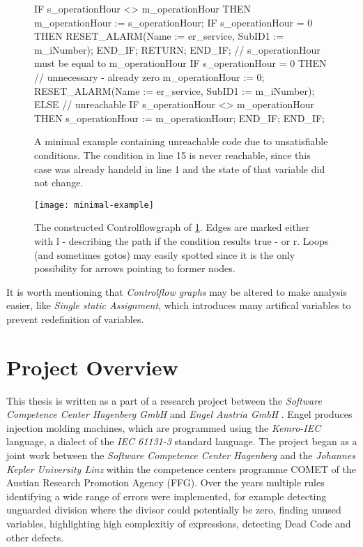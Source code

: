 \begin{figure}
    \begin{GenericCode}
    IF s_operationHour <> m_operationHour THEN
        m_operationHour := s_operationHour;
        IF s_operationHour = 0 THEN
            RESET_ALARM(Name := er_service, SubID1 := m_iNumber);
        END_IF;
        RETURN;
    END_IF;
    // s_operationHour must be equal to m_operationHour
    IF s_operationHour = 0 THEN
        // unnecessary - already zero
        m_operationHour := 0;
        RESET_ALARM(Name := er_service, SubID1 := m_iNumber);
    ELSE
        // unreachable
        IF s_operationHour <> m_operationHour THEN
            s_operationHour := m_operationHour;
        END_IF;
    END_IF;
    \end{GenericCode}
    \caption{A minimal example containing unreachable code due to unsatisfiable conditions. The condition in line 15 is never reachable, since this case was already handeld in line 1 and the state of that variable did not change.}
    \label{code:ex1}
\end{figure}
\begin{figure}
  \centering
  \texttt{[image: minimal-example]}
  \caption{The constructed Controlflowgraph of \ref{code:ex1}. Edges are marked either with l - describing the path if the condition results true - or r. Loops (and sometimes gotos) may easily spotted since it is the only possibility for arrows pointing to former nodes.}
  \label{fig:cfg}
\end{figure}

It is worth mentioning that \emph{Controlflow graphs} may be altered to make analysis easier, like \emph {Single static Assignment}, which introduces many artifical variables to prevent redefinition of variables.

\section{Project Overview}
This thesis is written as a part of a research project between the \emph{Software Competence Center Hagenberg GmbH} \cite{ScchGmbH} and \emph{Engel Austria GmbH} \cite{EngelGmbH}.
Engel produces injection molding machines, which are programmed using the \emph{Kemro-IEC} language, a dialect of the \emph{IEC 61131-3} standard language.
The project began as a joint work between the \emph{Software Competence Center Hagenberg} and the \emph{Johannes Kepler University Linz}  within the competence centers programme COMET of the Austian Research Promotion Agency (FFG).
Over the years multiple rules identifying a wide range of errors were implemented, for example detecting unguarded division where the divisor could potentially be zero, finding unused variables, highlighting high complexitiy of expressions, detecting Dead Code and other defects.

